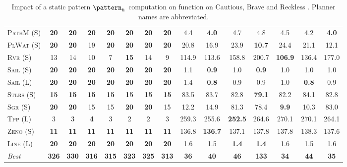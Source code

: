\documentclass[11pt,landscape]{article}
\begin{document}
\begin{table}[tb]
{\begin{tabular}{|l||ccccccc||ccccccc||}
\textsc{PathM} (S)&\textbf{20}&\textbf{20}&\textbf{20}&\textbf{20}&\textbf{20}&\textbf{20}&\textbf{20}&4.4&\textbf{4.0}&4.7&4.8&4.5&4.2&\textbf{4.0}\\
\textsc{PlWat} (S)&\textbf{20}&\textbf{20}&19&\textbf{20}&\textbf{20}&\textbf{20}&\textbf{20}&20.8&16.9&23.9&\textbf{10.7}&24.4&21.1&12.1\\
\textsc{Rvr} (S)&13&14&10&7&\textbf{15}&14&9&114.9&113.6&158.8&200.7&\textbf{106.9}&136.4&177.0\\
\textsc{Sail} (S)&\textbf{20}&\textbf{20}&\textbf{20}&\textbf{20}&\textbf{20}&\textbf{20}&\textbf{20}&1.1&\textbf{0.9}&1.0&\textbf{0.9}&1.0&1.0&1.0\\
\textsc{Sail} (L)&\textbf{20}&\textbf{20}&\textbf{20}&\textbf{20}&\textbf{20}&\textbf{20}&\textbf{20}&1.4&\textbf{0.8}&0.9&0.9&1.0&\textbf{0.8}&0.9\\
\textsc{Stlrs} (S)&\textbf{15}&\textbf{15}&\textbf{15}&\textbf{15}&\textbf{15}&\textbf{15}&\textbf{15}&83.5&83.7&82.8&\textbf{79.1}&82.2&84.1&82.8\\
\textsc{Sgr} (S)&\textbf{20}&\textbf{20}&15&15&\textbf{20}&\textbf{20}&15&12.2&14.9&81.3&78.4&\textbf{9.9}&10.3&83.0\\
\textsc{Tpp} (L)&3&3&\textbf{4}&3&2&2&3&259.3&255.6&\textbf{252.5}&264.6&270.1&270.1&264.1\\
\textsc{Zeno} (S)&\textbf{11}&\textbf{11}&\textbf{11}&\textbf{11}&\textbf{11}&\textbf{11}&\textbf{11}&136.8&\textbf{136.7}&137.1&137.8&137.8&138.3&137.6\\
\textsc{Line} (L)&\textbf{20}&\textbf{20}&\textbf{20}&\textbf{20}&\textbf{20}&\textbf{20}&\textbf{20}&1.6&1.5&\textbf{1.4}&\textbf{1.4}&1.6&1.5&1.6
\\\hline
\textit{Best}&\textbf{326}&\textbf{330}&\textbf{316}&\textbf{315}&\textbf{323}&\textbf{325}&\textbf{313}&\textbf{36}&\textbf{40}&\textbf{46}&\textbf{133}&\textbf{34}&\textbf{44}&\textbf{35}\\\hline

        \end{tabular}}
        \caption{Impact of a static pattern $\pattern_h$ computation on function on Cautious, Brave and Reckless \pattyd. Planner names are abbreviated.}
        \label{tab:abl-patternh-static}
        \end{table}
        
\end{document}
